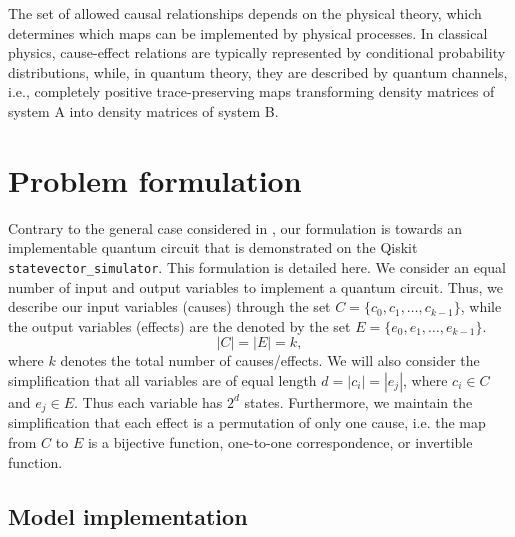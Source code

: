 \documentclass[
 aps,
 jmp,
 amsmath,amssymb,
 reprint,
]{revtex4-2}
\begin{document}
The set of allowed causal relationships depends on the physical theory, which determines which maps can be implemented by physical processes.
In classical physics, cause-effect relations are typically represented by conditional probability distributions, while, in quantum theory, they are described by quantum channels, i.e., completely positive trace-preserving maps transforming density matrices of system A into density matrices of system B.

\section{Problem formulation}\label{sec:prob-formulation}
Contrary to the general case considered in \cite{chiribella2019quantum}, our formulation is towards an implementable quantum circuit that is demonstrated on the Qiskit \texttt{statevector\_simulator}. 
This formulation is detailed here. We consider an equal number of input and output variables to implement a quantum circuit. 
Thus, we describe our input variables (causes) through the set $C = \{c_0, c_1,\dots, c_{k-1}\}$, while the output variables (effects) are the denoted by the set $E = \{e_0, e_1,\dots, e_{k-1}\}$.
\begin{equation}
|C| = |E| = k,
\end{equation}
where $k$ denotes the total number of causes/effects. We will also consider the simplification that all variables are of equal length $d = |c_i| = |e_j|$, where $c_i \in C$ and $e_j \in E$.
Thus each variable has $2^d$ states. Furthermore, we maintain the simplification that each effect is a permutation of only one cause, i.e. the map from $C$ to $E$ is a bijective function, one-to-one correspondence, or invertible function.

\subsection{Model implementation}
\end{document}
